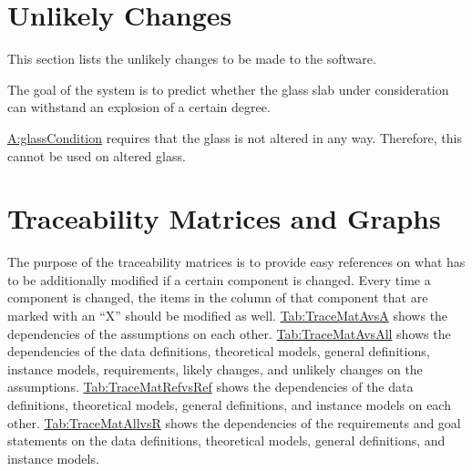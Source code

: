 \documentclass[12pt]{article}
\begin{document}
\section{Unlikely Changes}
\label{Sec:UCs}
This section lists the unlikely changes to be made to the software.

\begin{description}[font=\normalfont]
\item[Predict-Withstanding-of-Certain-Degree:\phantomsection\label{predictWithstandOfCertDeg}]{The goal of the system is to predict whether the glass slab under consideration can withstand an explosion of a certain degree.}
\item[Accommodate-Altered-Glass:\phantomsection\label{accAlteredGlass}]{\hyperref[assumpGC]{A:glassCondition} requires that the glass is not altered in any way. Therefore, this cannot be used on altered glass.}
\end{description}
\section{Traceability Matrices and Graphs}
\label{Sec:TraceMatrices}
The purpose of the traceability matrices is to provide easy references on what has to be additionally modified if a certain component is changed. Every time a component is changed, the items in the column of that component that are marked with an ``X'' should be modified as well. \hyperref[Table:TraceMatAvsA]{Tab:TraceMatAvsA} shows the dependencies of the assumptions on each other. \hyperref[Table:TraceMatAvsAll]{Tab:TraceMatAvsAll} shows the dependencies of the data definitions, theoretical models, general definitions, instance models, requirements, likely changes, and unlikely changes on the assumptions. \hyperref[Table:TraceMatRefvsRef]{Tab:TraceMatRefvsRef} shows the dependencies of the data definitions, theoretical models, general definitions, and instance models on each other. \hyperref[Table:TraceMatAllvsR]{Tab:TraceMatAllvsR} shows the dependencies of the requirements and goal statements on the data definitions, theoretical models, general definitions, and instance models.
\end{document}

